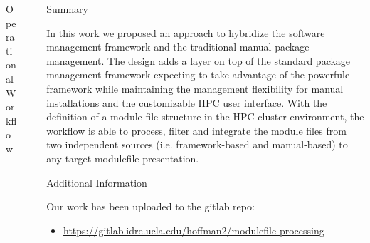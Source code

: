 \documentclass[final]{beamer}
\newlength{\sepwid}
\newlength{\onecolwid}
\begin{document}
\begin{frame}[t]
\begin{columns}[t]
\begin{column}{\onecolwid}
\begin{block}{Operational Workflow}
\end{block}

\end{column} %


\begin{column}{\sepwid}\end{column} %

\begin{column}{\onecolwid} %


\begin{block}{Summary}

In this work we proposed an approach to hybridize the software management framework and the traditional manual package management. 
The design adds a layer on top of the standard package management framework expecting to take advantage of the powerfule framework while maintaining the management flexibility for manual installations and the customizable HPC user interface. 
With the definition of a module file structure in the HPC cluster environment, the workflow is able to process, filter and integrate the module files from two independent sources (i.e. framework-based and manual-based) to any target modulefile presentation. 

\end{block}


\begin{block}{Additional Information}

Our work has been uploaded to the gitlab repo:
\begin{itemize}
\item \href{https://gitlab.idre.ucla.edu/hoffman2/modulefile-processing}{https://gitlab.idre.ucla.edu/hoffman2/modulefile-processing}
\end{itemize}

\end{block}



\end{column}
\end{columns}
\end{frame}
\end{document}
